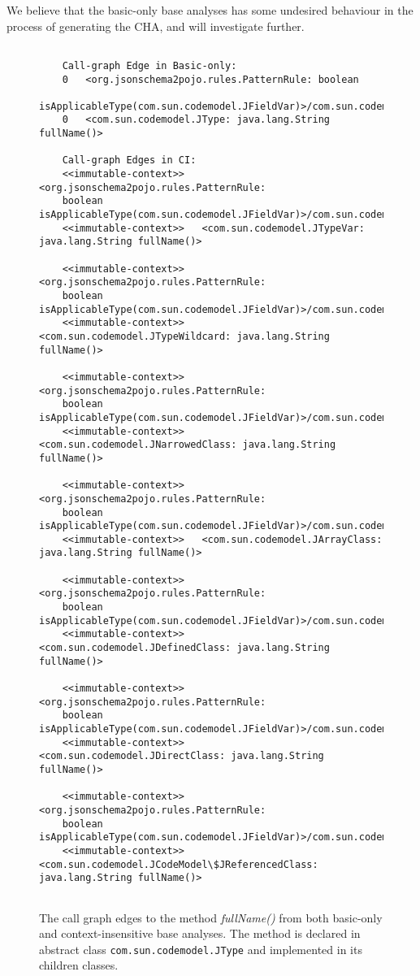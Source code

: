We believe that the basic-only base analyses has some undesired behaviour in the process of generating the CHA, and will investigate further.


\begin{figure}
	\begin{lstlisting}[basicstyle=\ttfamily\scriptsize, numbers=none, framesep=4.5mm, framexleftmargin=1.0mm, captionpos=b, escapechar=|]
	
	Call-graph Edge in Basic-only:
	0	<org.jsonschema2pojo.rules.PatternRule: boolean 
	isApplicableType(com.sun.codemodel.JFieldVar)>/com.sun.codemodel.JClass.fullName/0	
	0	<com.sun.codemodel.JType: java.lang.String fullName()>
	
	Call-graph Edges in CI:
	<<immutable-context>>	<org.jsonschema2pojo.rules.PatternRule: 
	boolean isApplicableType(com.sun.codemodel.JFieldVar)>/com.sun.codemodel.JClass.fullName/0
	<<immutable-context>>	<com.sun.codemodel.JTypeVar: java.lang.String fullName()>
	
	<<immutable-context>>	<org.jsonschema2pojo.rules.PatternRule: 
	boolean isApplicableType(com.sun.codemodel.JFieldVar)>/com.sun.codemodel.JClass.fullName/0	
	<<immutable-context>>	<com.sun.codemodel.JTypeWildcard: java.lang.String fullName()>
		
	<<immutable-context>>	<org.jsonschema2pojo.rules.PatternRule: 
	boolean isApplicableType(com.sun.codemodel.JFieldVar)>/com.sun.codemodel.JClass.fullName/0	
	<<immutable-context>>	<com.sun.codemodel.JNarrowedClass: java.lang.String fullName()>
	
	<<immutable-context>>	<org.jsonschema2pojo.rules.PatternRule: 
	boolean isApplicableType(com.sun.codemodel.JFieldVar)>/com.sun.codemodel.JClass.fullName/0	
	<<immutable-context>>	<com.sun.codemodel.JArrayClass: java.lang.String fullName()>
	
	<<immutable-context>>	<org.jsonschema2pojo.rules.PatternRule: 
	boolean isApplicableType(com.sun.codemodel.JFieldVar)>/com.sun.codemodel.JClass.fullName/0	
	<<immutable-context>>	<com.sun.codemodel.JDefinedClass: java.lang.String fullName()>
	
	<<immutable-context>>	<org.jsonschema2pojo.rules.PatternRule: 
	boolean isApplicableType(com.sun.codemodel.JFieldVar)>/com.sun.codemodel.JClass.fullName/0	
	<<immutable-context>>	<com.sun.codemodel.JDirectClass: java.lang.String fullName()>
	
	<<immutable-context>>	<org.jsonschema2pojo.rules.PatternRule: 
	boolean isApplicableType(com.sun.codemodel.JFieldVar)>/com.sun.codemodel.JClass.fullName/0	
	<<immutable-context>>	<com.sun.codemodel.JCodeModel\$JReferencedClass: java.lang.String fullName()>
	
	\end{lstlisting}
	\caption{The call graph edges to the method \textit{fullName()} from both basic-only and context-insensitive base analyses. The method is declared in abstract class \texttt{com.sun.codemodel.JType} and implemented in its children classes.}
	\label{fig:edgesToSiblingMethod}
	
\end{figure}

